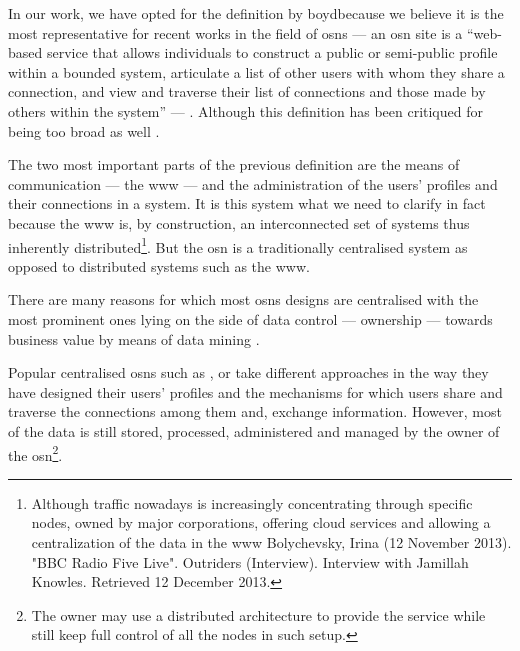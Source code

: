 \documentclass[showtrims,oldfontcommands]{kthesis}
\begin{document}
In our work, we have opted for the definition by boyd\etal because we 
believe it is the most representative for recent works in the field of \acp{osn} 
--- an \ac{osn} site is a ``web-based service that allows individuals to construct 
a public or semi-public profile within a bounded system, articulate a list of other 
users with whom they share a connection, and view and traverse their list of connections 
and those made by others within the system'' --- \cite{boydE07}. Although this definition 
has been critiqued for being too broad as well \cite{Beer08}.

The two most important parts of the previous definition are the means of communication 
--- the \ac{www} --- and the administration of the users' profiles and their connections 
in a system. It is this system what we need to clarify in fact because the \ac{www} 
is, by construction, an interconnected set of systems thus inherently distributed\footnote{
Although \Internet traffic nowadays is increasingly concentrating through specific 
nodes, owned by major corporations, offering cloud services and allowing a centralization 
of the data in the \ac{www} Bolychevsky, Irina (12 November 2013). "BBC Radio Five Live". Outriders (Interview). Interview with Jamillah Knowles. Retrieved 12 December 2013.}. 
But the \ac{osn} is a traditionally centralised system as opposed to distributed 
systems such as the \ac{www}.



There are many reasons for which most \acp{osn} designs are centralised with the 
most prominent ones lying on the side of data control --- ownership --- 
towards business value by means of data mining \cite{DomingosR01}.

Popular centralised \acp{osn} such as \Facebook, \Twitter or \GooglePlus take different 
approaches in the way they have designed their users' profiles and the mechanisms 
for which users share and traverse the connections among them and, exchange information. 
However, most of the data is still stored, processed, administered and managed by 
the owner of the \ac{osn}\footnote{The owner may use a distributed architecture 
to provide the service while still keep full control of all the nodes in such setup.}.
\end{document}
